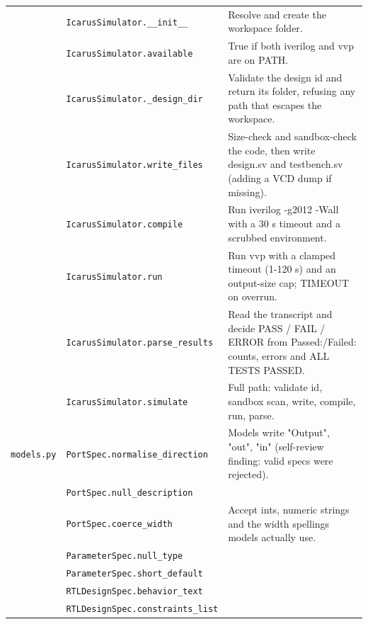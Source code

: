 \begin{longtable}{@{}p{2.8cm}>{\raggedright\arraybackslash}p{4.6cm}p{7.9cm}@{}}
{\small } & \texttt{\small IcarusSimulator.\allowbreak \_\allowbreak{}\_\allowbreak{}init\_\allowbreak{}\_\allowbreak{}} & Resolve and create the workspace folder. \\
{\small } & \texttt{\small IcarusSimulator.\allowbreak available} & True if both iverilog and vvp are on PATH. \\
{\small } & \texttt{\small IcarusSimulator.\allowbreak \_\allowbreak{}design\_\allowbreak{}dir} & Validate the design id and return its folder, refusing any path that escapes the workspace. \\
{\small } & \texttt{\small IcarusSimulator.\allowbreak write\_\allowbreak{}files} & Size-check and sandbox-check the code, then write design.sv and testbench.sv (adding a VCD dump if missing). \\
{\small } & \texttt{\small IcarusSimulator.\allowbreak compile} & Run iverilog -g2012 -Wall with a 30 s timeout and a scrubbed environment. \\
{\small } & \texttt{\small IcarusSimulator.\allowbreak run} & Run vvp with a clamped timeout (1-120 s) and an output-size cap; TIMEOUT on overrun. \\
{\small } & \texttt{\small IcarusSimulator.\allowbreak parse\_\allowbreak{}results} & Read the transcript and decide PASS / FAIL / ERROR from Passed:/Failed: counts, errors and ALL TESTS PASSED. \\
{\small } & \texttt{\small IcarusSimulator.\allowbreak simulate} & Full path: validate id, sandbox scan, write, compile, run, parse. \\
{\small \nolinkurl{models.py}} & \texttt{\small PortSpec.\allowbreak normalise\_\allowbreak{}direction} & Models write "Output", "out", "in" (self-review finding: valid specs were rejected). \\
{\small } & \texttt{\small PortSpec.\allowbreak null\_\allowbreak{}description} &  \\
{\small } & \texttt{\small PortSpec.\allowbreak coerce\_\allowbreak{}width} & Accept ints, numeric strings and the width spellings models actually use. \\
{\small } & \texttt{\small ParameterSpec.\allowbreak null\_\allowbreak{}type} &  \\
{\small } & \texttt{\small ParameterSpec.\allowbreak short\_\allowbreak{}default} &  \\
{\small } & \texttt{\small RTLDesignSpec.\allowbreak behavior\_\allowbreak{}text} &  \\
{\small } & \texttt{\small RTLDesignSpec.\allowbreak constraints\_\allowbreak{}list} &  \\

\end{longtable}
